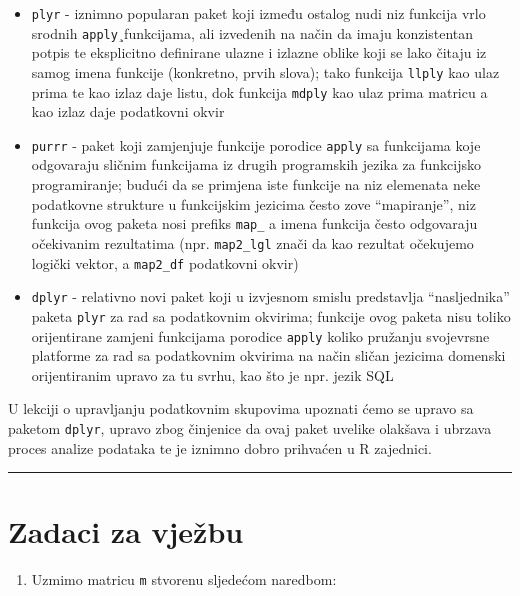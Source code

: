 \documentclass[]{book}
\providecommand{\tightlist}{%
  \setlength{\itemsep}{0pt}\setlength{\parskip}{0pt}}
\theoremstyle{definition}
\theoremstyle{definition}
\theoremstyle{definition}
\theoremstyle{remark}
\begin{document}
\begin{itemize}
\tightlist
\item
  \texttt{plyr} - iznimno popularan paket koji između ostalog nudi niz
  funkcija vrlo srodnih \texttt{apply}¸funkcijama, ali izvedenih na
  način da imaju konzistentan potpis te eksplicitno definirane ulazne i
  izlazne oblike koji se lako čitaju iz samog imena funkcije (konkretno,
  prvih slova); tako funkcija \texttt{llply} kao ulaz prima te kao izlaz
  daje listu, dok funkcija \texttt{mdply} kao ulaz prima matricu a kao
  izlaz daje podatkovni okvir
\item
  \texttt{purrr} - paket koji zamjenjuje funkcije porodice
  \texttt{apply} sa funkcijama koje odgovaraju sličnim funkcijama iz
  drugih programskih jezika za funkcijsko programiranje; budući da se
  primjena iste funkcije na niz elemenata neke podatkovne strukture u
  funkcijskim jezicima često zove ``mapiranje'', niz funkcija ovog
  paketa nosi prefiks \texttt{map\_} a imena funkcija često odgovaraju
  očekivanim rezultatima (npr. \texttt{map2\_lgl} znači da kao rezultat
  očekujemo logički vektor, a \texttt{map2\_df} podatkovni okvir)
\item
  \texttt{dplyr} - relativno novi paket koji u izvjesnom smislu
  predstavlja ``nasljednika'' paketa \texttt{plyr} za rad sa podatkovnim
  okvirima; funkcije ovog paketa nisu toliko orijentirane zamjeni
  funkcijama porodice \texttt{apply} koliko pružanju svojevrsne
  platforme za rad sa podatkovnim okvirima na način sličan jezicima
  domenski orijentiranim upravo za tu svrhu, kao što je npr. jezik SQL
\end{itemize}

U lekciji o upravljanju podatkovnim skupovima upoznati ćemo se upravo sa
paketom \texttt{dplyr}, upravo zbog činjenice da ovaj paket uvelike
olakšava i ubrzava proces analize podataka te je iznimno dobro prihvaćen
u R zajednici.

\begin{center}\rule{0.5\linewidth}{\linethickness}\end{center}

\section*{Zadaci za vježbu}\label{zadaci-za-vjezbu-6}

\begin{enumerate}
\def\labelenumi{\arabic{enumi}.}
\tightlist
\item
  Uzmimo matricu \texttt{m} stvorenu sljedećom naredbom:
\end{enumerate}
\end{document}

